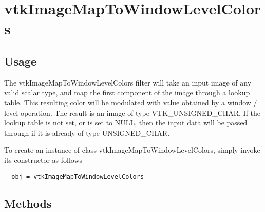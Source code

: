 \section{vtkImageMapToWindowLevelColors}

\subsection{Usage}

 The vtkImageMapToWindowLevelColors filter will take an input image of any
 valid scalar type, and map the first component of the image through a
 lookup table.  This resulting color will be modulated with value obtained
 by a window / level operation. The result is an image of type 
 VTK\_UNSIGNED\_CHAR. If the lookup table is not set, or is set to NULL, then 
 the input data will be passed through if it is already of type 
 UNSIGNED\_CHAR.


To create an instance of class vtkImageMapToWindowLevelColors, simply
invoke its constructor as follows
\begin{verbatim}
  obj = vtkImageMapToWindowLevelColors
\end{verbatim}
\subsection{Methods}


